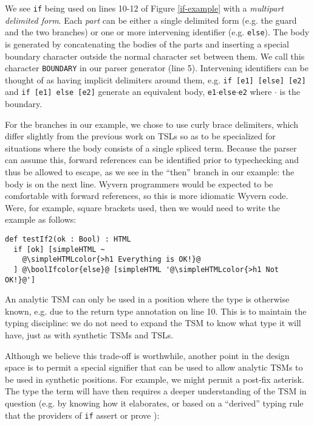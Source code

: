 \documentclass{sig-alternate}
\newcommand{\simpleHTMLcolor}[1]{\textcolor[HTML]{7D5100}{#1}}
\newcommand{\boolIfcolor}[1]{\textcolor[HTML]{5E0C0C}{#1}}
\begin{document}
We see \verb|if| being used on lines 10-12 of Figure \ref{if-example} with a \emph{multipart delimited form}. Each \emph{part} can be either a single delimited form (e.g. the guard and the two branches) or one or more intervening identifier (e.g. \verb|else|). The body is generated by concatenating the bodies of the parts and inserting a special boundary character outside the normal character set between them. We call this character \verb|BOUNDARY| in our parser generator (line 5). Intervening identifiers can be thought of as having implicit delimiters around them, e.g. \verb|if [e1] [else] [e2]| and \verb|if [e1] else [e2]| generate an equivalent body, \texttt{e1}$\cdot$\verb|else|$\cdot$\verb|e2| where $\cdot$ is the boundary.

For the branches in our example, we chose to use curly brace delimiters, which  differ slightly from the previous work on TSLs so as to be specialized for situations where the body consists of a single spliced term. Because the parser can assume this, forward references can be identified prior to typechecking and thus be allowed to escape, as we see in the ``then'' branch in our example: the body is on the next line. Wyvern programmers would be expected to be comfortable with forward references, so this is more idiomatic Wyvern code. Were, for example, square brackets used, then we would need to write the example as follows:

\begin{lstlisting}[style=wyvern]
def testIf2(ok : Bool) : HTML
  if [ok] [simpleHTML ~
    @\simpleHTMLcolor{>h1 Everything is OK!}@
  ] @\boolIfcolor{else}@ [simpleHTML '@\simpleHTMLcolor{>h1 Not OK!}@']
\end{lstlisting}

An analytic TSM can only be used in a position where the type is otherwise known, e.g. due to the return type annotation on line 10. This is to maintain the typing discipline: we do not need to expand the TSM to know what type it will have, just as with synthetic TSMs and TSLs. 

Although we believe this trade-off is worthwhile, another point in the design space is to permit a special signifier that can be used to allow analytic TSMs to be used in synthetic positions. For example, we might permit a post-fix asterisk. The type the term will have then requires a deeper understanding of the TSM in question (e.g. by knowing how it elaborates, or based on a ``derived'' typing rule that the providers of \verb|if| assert or prove \cite{conf/icfp/LorenzenE13}):
\end{document}
